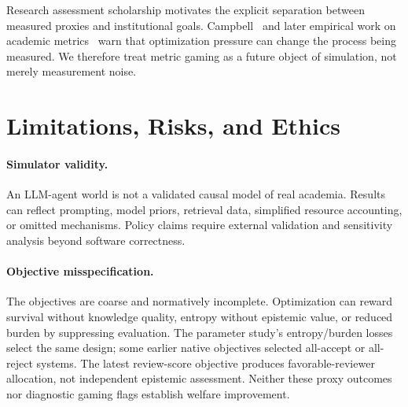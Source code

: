 \documentclass{article}
\begin{document}
Research assessment scholarship motivates the explicit separation between measured proxies and institutional goals. Campbell~\citep{campbell1979assessing} and later empirical work on academic metrics~\citep{fire2019overoptimization} warn that optimization pressure can change the process being measured. We therefore treat metric gaming as a future object of simulation, not merely measurement noise.

\section{Limitations, Risks, and Ethics}

\paragraph{Simulator validity.} An LLM-agent world is not a validated causal model of real academia. Results can reflect prompting, model priors, retrieval data, simplified resource accounting, or omitted mechanisms. Policy claims require external validation and sensitivity analysis beyond software correctness.

\paragraph{Objective misspecification.} The objectives are coarse and normatively
incomplete. Optimization can reward survival without knowledge quality,
entropy without epistemic value, or reduced burden by suppressing evaluation.
The parameter study's entropy/burden losses select the same design;
some earlier native objectives selected all-accept or all-reject systems. The latest
review-score objective produces favorable-reviewer allocation, not independent
epistemic assessment. Neither these proxy outcomes nor diagnostic gaming flags
establish welfare improvement.
\end{document}
